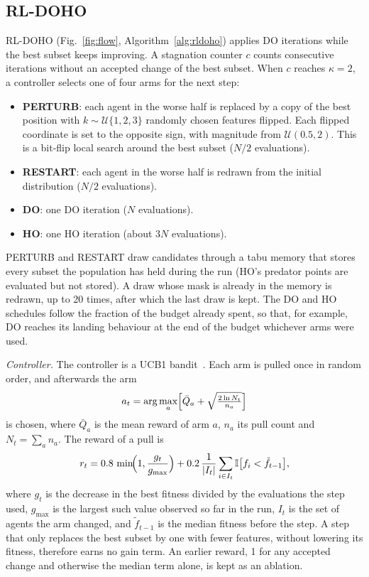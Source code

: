 \documentclass[journal]{IEEEtran}
\begin{document}
\subsection{RL-DOHO}
RL-DOHO (Fig.~\ref{fig:flow}, Algorithm~\ref{alg:rldoho}) applies DO iterations while the best subset keeps improving. A stagnation counter $c$ counts consecutive iterations without an accepted change of the best subset. When $c$ reaches $\kappa=2$, a controller selects one of four arms for the next step:
\begin{itemize}
\item \textbf{PERTURB}: each agent in the worse half is replaced by a copy of the best position with $k\sim\mathcal{U}\{1,2,3\}$ randomly chosen features flipped. Each flipped coordinate is set to the opposite sign, with magnitude from $\mathcal{U}(0.5,2)$. This is a bit-flip local search around the best subset ($N/2$ evaluations).
\item \textbf{RESTART}: each agent in the worse half is redrawn from the initial distribution ($N/2$ evaluations).
\item \textbf{DO}: one DO iteration ($N$ evaluations).
\item \textbf{HO}: one HO iteration (about $3N$ evaluations).
\end{itemize}
PERTURB and RESTART draw candidates through a tabu memory that stores every subset the population has held during the run (HO's predator points are evaluated but not stored). A draw whose mask is already in the memory is redrawn, up to 20 times, after which the last draw is kept. The DO and HO schedules follow the fraction of the budget already spent, so that, for example, DO reaches its landing behaviour at the end of the budget whichever arms were used.

\emph{Controller.} The controller is a UCB1 bandit~\cite{auer2002}. Each arm is pulled once in random order, and afterwards the arm
\begin{equation}
a_t=\arg\max_a\Bigl[\bar{Q}_a + \sqrt{\tfrac{2\ln N_t}{n_a}}\Bigr]
\end{equation}
is chosen, where $\bar{Q}_a$ is the mean reward of arm $a$, $n_a$ its pull count and $N_t=\sum_a n_a$. The reward of a pull is
\begin{equation}
r_t=0.8\,\min\!\Bigl(1,\frac{g_t}{g_{\max}}\Bigr)+0.2\,\frac{1}{|I_t|}\sum_{i\in I_t}\mathbb{I}\bigl[f_i<\tilde f_{t-1}\bigr],
\label{eq:reward}
\end{equation}
where $g_t$ is the decrease in the best fitness divided by the evaluations the step used, $g_{\max}$ is the largest such value observed so far in the run, $I_t$ is the set of agents the arm changed, and $\tilde f_{t-1}$ is the median fitness before the step. A step that only replaces the best subset by one with fewer features, without lowering its fitness, therefore earns no gain term. An earlier reward, 1 for any accepted change and otherwise the median term alone, is kept as an ablation.
\end{document}

